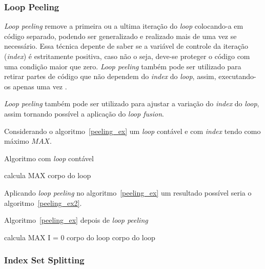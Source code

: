 \subsubsection{Loop Peeling}

\textit{Loop peeling} remove a primeira ou a ultima iteração do \textit{loop} 
colocando-a em código separado, podendo ser generalizado e realizado mais 
de uma vez se necessário. 
Essa técnica depente de saber se a variável de controle da iteração
(\textit{index}) é estritamente positiva, caso não o seja, deve-se proteger 
o código com uma condição maior que zero.
\textit{Loop peeling} também pode ser utilizado para retirar partes de código 
que não dependem do \textit{index} do \textit{loop}, assim, executando-os apenas
uma vez \cite{hpcfpc}.

\textit{Loop peeling} também pode ser utilizado para ajustar a variação do 
\textit{index} do \textit{loop}, assim tornando possível a aplicação 
do \textit{loop fusion}.

Considerando o algoritmo~\ref{peeling_ex} um \textit{loop} contável e 
com \textit{index} tendo como máximo $MAX$.

\begin{algorithm}
\caption{Algoritmo com \textit{loop} contável}
\label{peeling_ex}
\begin{algorithmic}[1]

\STATE calcula MAX
\STATE corpo do loop
\ENDFOR

\end{algorithmic}
\end{algorithm}

Aplicando \textit{loop peeling} no algoritmo~\ref{peeling_ex} um resultado
possível seria o algoritmo~\ref{peeling_ex2}.

\begin{algorithm}
\caption{Algoritmo~\ref{peeling_ex} depois de \textit{loop peeling}}
\label{peeling_ex2}
\begin{algorithmic}[1]

\STATE calcula MAX
\STATE I = 0
\STATE corpo do loop
\STATE corpo do loop
\ENDFOR
\ENDIF

\end{algorithmic}
\end{algorithm}


\subsubsection{Index Set Splitting}

